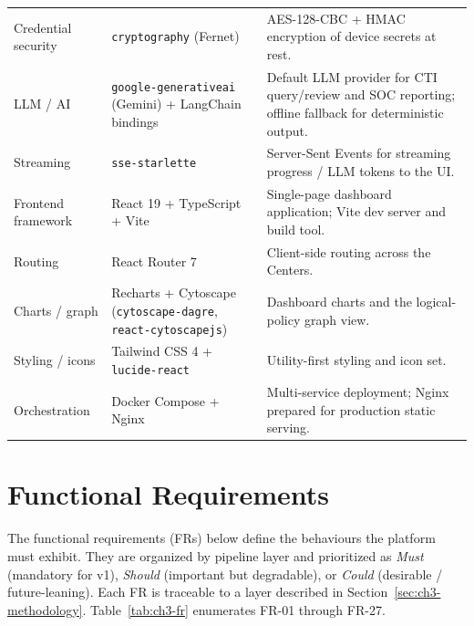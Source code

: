 \documentclass[12pt,a4paper]{report}
\renewcommand{\_}{\textunderscore\allowbreak}
\newcommand{\hrow}{}
\newcommand{\altrow}{}
\begin{document}
{\begin{longtable}{L{2.8cm} L{5.4cm} L{6.4cm}}
\altrow Credential security & \texttt{cryptography} (Fernet) & AES-128-CBC + HMAC encryption of device secrets at rest. \\
\hrow LLM / AI & \texttt{google-generativeai} (Gemini) + LangChain bindings & Default LLM provider for CTI query/review and SOC reporting; offline fallback for deterministic output. \\
\altrow Streaming & \texttt{sse-starlette} & Server-Sent Events for streaming progress / LLM tokens to the UI. \\
\hrow Frontend framework & React 19 + TypeScript + Vite & Single-page dashboard application; Vite dev server and build tool. \\
\altrow Routing & React Router 7 & Client-side routing across the Centers. \\
\hrow Charts / graph & Recharts + Cytoscape (\texttt{cytoscape-dagre}, \texttt{react-cytoscapejs}) & Dashboard charts and the logical-policy graph view. \\
\altrow Styling / icons & Tailwind CSS 4 + \texttt{lucide-react} & Utility-first styling and icon set. \\
\hrow Orchestration & Docker Compose + Nginx & Multi-service deployment; Nginx prepared for production static serving. \\
\end{longtable}
}

\section{Functional Requirements}
\label{sec:ch3-functional}

The functional requirements (FRs) below define the behaviours the platform must exhibit. They are organized by pipeline layer and prioritized as \emph{Must} (mandatory for v1), \emph{Should} (important but degradable), or \emph{Could} (desirable / future-leaning). Each FR is traceable to a layer described in Section~\ref{sec:ch3-methodology}. Table~\ref{tab:ch3-fr} enumerates FR-01 through FR-27.
\end{document}
